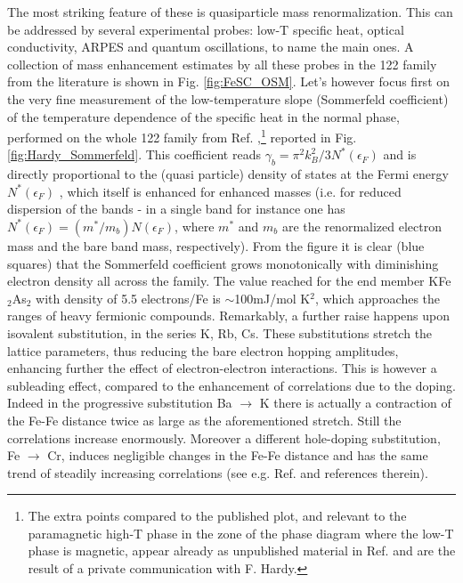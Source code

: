 \documentclass[12pt,twoside]{article}
\def\eps{\epsilon}
\begin{document}
The most striking feature of these is quasiparticle mass renormalization.
This can be addressed by several experimental probes: low-T specific heat, optical conductivity, ARPES and quantum oscillations, to name the main ones. 
A collection of mass enhancement estimates by all these probes in the 122 family from the literature is shown in Fig. \ref{fig:FeSC_OSM}. Let's however focus first on the very fine measurement of the low-temperature slope (Sommerfeld coefficient) of the temperature dependence of the specific heat in the normal phase, performed on the whole 122 family from Ref. \cite{Hardy_122_SlaveSpin_exp},\footnote{The extra points compared to the published plot, and relevant to the paramagnetic high-T phase in the zone of the phase diagram where the low-T phase is magnetic, appear already as unpublished material in Ref. \cite{demedici_Vietri} and are the result of a private communication with F. Hardy.} reported in Fig. \ref{fig:Hardy_Sommerfeld}.
This coefficient reads $\gamma_b=\pi^2k_B^2/3 N^*(\eps_F)$ and is directly proportional to the (quasi particle) density of states at the Fermi energy $N^*(\eps_F)$ \cite{Ashcroft}, which itself is enhanced for enhanced masses (i.e. for reduced dispersion of the bands - in a single band for instance one has $N^*(\eps_F)=(m^*/m_b) N(\eps_F)$, where $m^*$ and $m_b$ are the renormalized electron mass and the bare band mass, respectively).
From the figure it is clear (blue squares) that the Sommerfeld coefficient grows monotonically with diminishing electron density all across the family. The value reached for the end member KFe$_2$As$_2$ with density of 5.5 electrons/Fe is $\sim$100mJ/mol K$^2$, which approaches the ranges of heavy fermionic compounds. Remarkably, a further raise happens upon isovalent substitution, in the series K, Rb, Cs. These substitutions stretch the lattice parameters, thus reducing the bare electron hopping amplitudes, enhancing further the effect of electron-electron interactions. This is however a subleading effect, compared to the enhancement of correlations due to the doping. Indeed in the progressive substitution Ba $\rightarrow$ K there is actually a contraction of the Fe-Fe distance twice as large as the aforementioned stretch. Still the correlations increase enormously. Moreover a different hole-doping substitution, Fe $\rightarrow$ Cr, induces negligible changes in the Fe-Fe distance and has the same trend of steadily increasing correlations (see e.g. Ref. \cite{Lafuerza_XES_122} and references therein).
\end{document}
